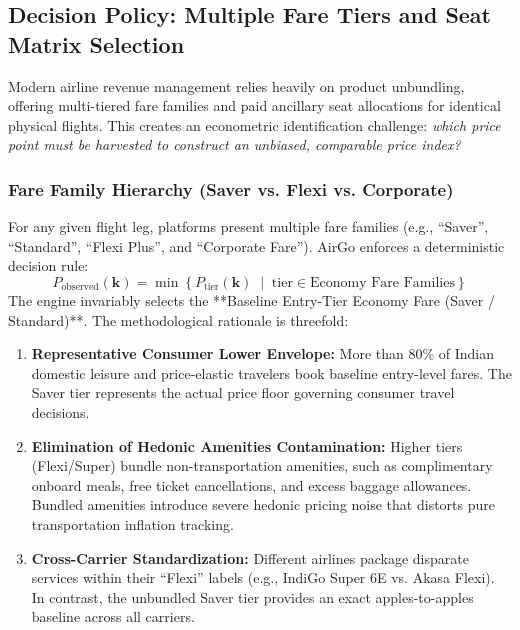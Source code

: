 \documentclass[11pt,a4paper]{article}
\begin{document}
\subsection{Decision Policy: Multiple Fare Tiers and Seat Matrix Selection}
\label{sec:tier_and_seat_selection}
Modern airline revenue management relies heavily on product unbundling, offering multi-tiered fare families and paid ancillary seat allocations for identical physical flights. This creates an econometric identification challenge: \textit{which price point must be harvested to construct an unbiased, comparable price index?}

\subsubsection{Fare Family Hierarchy (Saver vs. Flexi vs. Corporate)}
For any given flight leg, platforms present multiple fare families (e.g., ``Saver'', ``Standard'', ``Flexi Plus'', and ``Corporate Fare''). AirGo enforces a deterministic decision rule:
\begin{equation}
P_{\text{observed}}(\mathbf{k}) = \min \left\{ P_{\text{tier}}(\mathbf{k}) \;\middle|\; \text{tier} \in \text{Economy Fare Families} \right\}
\end{equation}
The engine invariably selects the **Baseline Entry-Tier Economy Fare (Saver / Standard)**. The methodological rationale is threefold:
\begin{enumerate}
    \item \textbf{Representative Consumer Lower Envelope:} More than $80\%$ of Indian domestic leisure and price-elastic travelers book baseline entry-level fares. The Saver tier represents the actual price floor governing consumer travel decisions.
    \item \textbf{Elimination of Hedonic Amenities Contamination:} Higher tiers (Flexi/Super) bundle non-transportation amenities, such as complimentary onboard meals, free ticket cancellations, and excess baggage allowances. Bundled amenities introduce severe hedonic pricing noise that distorts pure transportation inflation tracking.
    \item \textbf{Cross-Carrier Standardization:} Different airlines package disparate services within their ``Flexi'' labels (e.g., IndiGo Super 6E vs. Akasa Flexi). In contrast, the unbundled Saver tier provides an exact apples-to-apples baseline across all carriers.
\end{enumerate}
\end{document}
